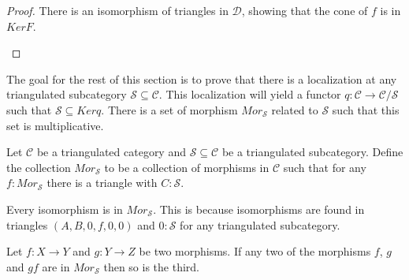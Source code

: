    \begin{proof}
        There is an isomorphism of triangles in $\mathcal{D}$, showing that the cone of $f$ is in $KerF$.
        \begin{center}
        \end{center}
    \end{proof}

    The goal for the rest of this section is to prove that there is a localization at any triangulated subcategory $\mathcal{S}\subseteq\mathcal{C}$. This localization will yield a functor $q:\mathcal{C}\rightarrow \mathcal{C}/\mathcal{S}$ such that $\mathcal{S}\subseteq Kerq$. There is a set of morphism $Mor_\mathcal{S}$ related to $\mathcal{S}$ such that this set is multiplicative.

    \begin{definition}
        Let $\mathcal{C}$ be a triangulated category and $\mathcal{S} \subseteq \mathcal{C}$ be a triangulated subcategory. Define the collection $Mor_{\mathcal{S}}$ to be a collection of morphisms in $\mathcal{C}$ such that for any $f : Mor_{\mathcal{S}}$ there is a triangle with $C : \mathcal{S}$.
        \begin{center}
        \end{center}
    \end{definition}

    \begin{remark}
        Every isomorphism is in $Mor_{\mathcal{S}}$. This is because isomorphisms are found in triangles $(A,B,0,f,0,0)$ and $0 : \mathcal{S}$ for any triangulated subcategory.
    \end{remark}

    \begin{lemma}
        Let $f : X \rightarrow Y$ and $g : Y \rightarrow Z$ be two morphisms. If any two of the morphisms $f$, $g$ and $gf$ are in $Mor_{\mathcal{S}}$ then so is the third.
    \end{lemma}

